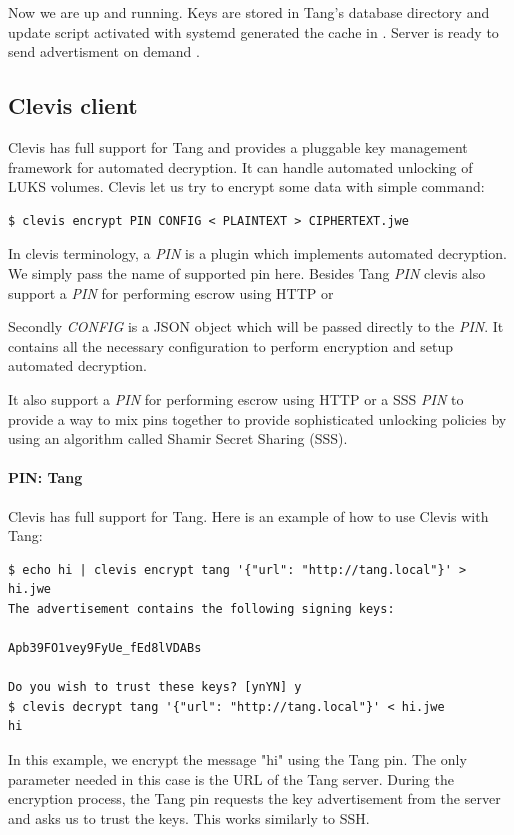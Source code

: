 Now we are up and running.
Keys are stored in Tang's database directory and update script activated with systemd generated the cache in .
Server is ready to send advertisment on demand \cite{tang}.



\subsection{Clevis client}\label{clevis}

Clevis has full support for Tang and provides a pluggable key management framework for automated decryption.
It can handle automated unlocking of LUKS volumes.
Clevis let us try to encrypt some data with simple command:
\begin{lstlisting}[columns=fixed,basicstyle=\ttfamily\footnotesize,tabsize=4,backgroundcolor=\color{yellow!10}]
$ clevis encrypt PIN CONFIG < PLAINTEXT > CIPHERTEXT.jwe
\end{lstlisting}
In clevis terminology, a {\it PIN} is a plugin which implements automated decryption.
We simply pass the name of supported pin here.
Besides Tang {\it PIN} clevis also support a {\it PIN} for performing escrow using HTTP or

Secondly {\it CONFIG} is a JSON object which will be passed directly to the {\it PIN}.
It contains all the necessary configuration to perform encryption and setup automated decryption.

It also support a {\it PIN} for performing escrow using HTTP or a SSS {\it PIN} to provide a way to mix pins together to provide sophisticated unlocking policies by using an algorithm called Shamir Secret Sharing (SSS).


\paragraph{PIN: Tang}
Clevis has full support for Tang.
Here is an example of how to use Clevis with Tang:
\begin{lstlisting}[columns=fixed,basicstyle=\ttfamily\footnotesize,tabsize=4,backgroundcolor=\color{yellow!10}]
$ echo hi | clevis encrypt tang '{"url": "http://tang.local"}' > hi.jwe
The advertisement contains the following signing keys:

Apb39FO1vey9FyUe_fEd8lVDABs

Do you wish to trust these keys? [ynYN] y
$ clevis decrypt tang '{"url": "http://tang.local"}' < hi.jwe
hi
\end{lstlisting}
In this example, we encrypt the message "hi" using the Tang pin.
The only parameter needed in this case is the URL of the Tang server.
During the encryption process, the Tang pin requests the key advertisement from the server and asks us to trust the keys.
This works similarly to SSH.

